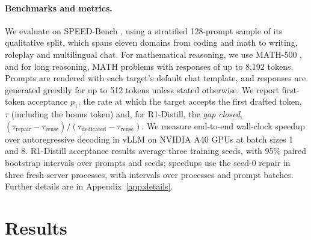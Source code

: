 \documentclass[11pt]{article}
\begin{document}
\paragraph{Benchmarks and metrics.}
We evaluate on SPEED-Bench \citep{abramovich2026speedbench}, using a stratified 128-prompt sample of its qualitative split, which spans eleven domains from coding and math to writing, roleplay and multilingual chat.
For mathematical reasoning, we use MATH-500 \citep{hendrycks2021math,lightman2024verify}, and for long reasoning, MATH problems with responses of up to 8,192 tokens.
Prompts are rendered with each target's default chat template, and responses are generated greedily for up to 512 tokens unless stated otherwise.
We report first-token acceptance $p_1$, the rate at which the target accepts the first drafted token, $\tau$ (including the bonus token) and, for R1-Distill, the \emph{gap closed}, $(\tau_{\text{repair}} - \tau_{\text{reuse}}) / (\tau_{\text{dedicated}} - \tau_{\text{reuse}})$.
We measure end-to-end wall-clock speedup over autoregressive decoding in vLLM on NVIDIA A40 GPUs at batch sizes 1 and 8.
R1-Distill acceptance results average three training seeds, with 95\% paired bootstrap intervals over prompts and seeds; speedups use the seed-0 repair in three fresh server processes, with intervals over processes and prompt batches.
Further details are in Appendix~\ref{app:details}.

\section{Results}
\label{sec:results}
\end{document}
